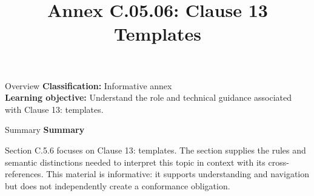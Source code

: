 \documentclass[10pt,letterpaper]{article}
\title{Annex C.05.06: Clause 13 Templates}
\author{}
\date{}
\begin{document}
\maketitle
\begin{CornellOverviewBox}{Overview}
\textbf{Classification:} Informative annex\\[2pt]
\textbf{Learning objective:} Understand the role and technical guidance associated with Clause 13: templates.
\end{CornellOverviewBox}\begin{CornellSummaryBox}{Summary}
{\sffamily\bfseries\color{Accent} Summary}\par\vspace{3pt}Section C.5.6 focuses on Clause 13: templates. The section supplies the rules and semantic distinctions needed to interpret this topic in context with its cross-references. This material is informative: it supports understanding and navigation but does not independently create a conformance obligation.
\end{CornellSummaryBox}
\end{document}
